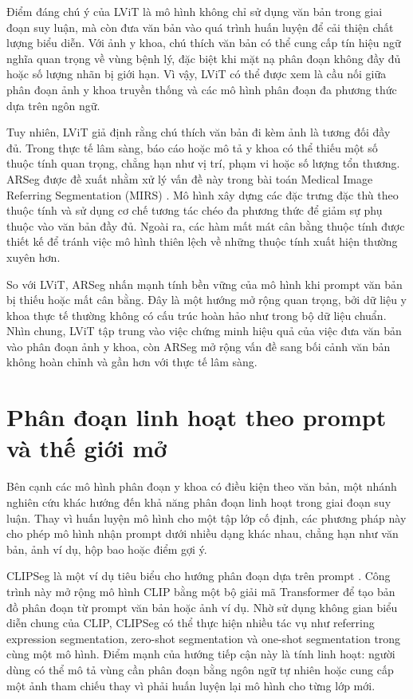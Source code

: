 Điểm đáng chú ý của LViT là mô hình không chỉ sử dụng văn bản trong giai đoạn suy luận, mà còn đưa văn bản vào quá trình huấn luyện để cải thiện chất lượng biểu diễn. Với ảnh y khoa, chú thích văn bản có thể cung cấp tín hiệu ngữ nghĩa quan trọng về vùng bệnh lý, đặc biệt khi mặt nạ phân đoạn không đầy đủ hoặc số lượng nhãn bị giới hạn. Vì vậy, LViT có thể được xem là cầu nối giữa phân đoạn ảnh y khoa truyền thống và các mô hình phân đoạn đa phương thức dựa trên ngôn ngữ.

Tuy nhiên, LViT giả định rằng chú thích văn bản đi kèm ảnh là tương đối đầy đủ. Trong thực tế lâm sàng, báo cáo hoặc mô tả y khoa có thể thiếu một số thuộc tính quan trọng, chẳng hạn như vị trí, phạm vi hoặc số lượng tổn thương. ARSeg được đề xuất nhằm xử lý vấn đề này trong bài toán Medical Image Referring Segmentation (MIRS) \cite{Wang_Lin_Yan}. Mô hình xây dựng các đặc trưng đặc thù theo thuộc tính và sử dụng cơ chế tương tác chéo đa phương thức để giảm sự phụ thuộc vào văn bản đầy đủ. Ngoài ra, các hàm mất mát cân bằng thuộc tính được thiết kế để tránh việc mô hình thiên lệch về những thuộc tính xuất hiện thường xuyên hơn.

So với LViT, ARSeg nhấn mạnh tính bền vững của mô hình khi prompt văn bản bị thiếu hoặc mất cân bằng. Đây là một hướng mở rộng quan trọng, bởi dữ liệu y khoa thực tế thường không có cấu trúc hoàn hảo như trong bộ dữ liệu chuẩn. Nhìn chung, LViT tập trung vào việc chứng minh hiệu quả của việc đưa văn bản vào phân đoạn ảnh y khoa, còn ARSeg mở rộng vấn đề sang bối cảnh văn bản không hoàn chỉnh và gần hơn với thực tế lâm sàng.

\section{Phân đoạn linh hoạt theo prompt và thế giới mở}

Bên cạnh các mô hình phân đoạn y khoa có điều kiện theo văn bản, một nhánh nghiên cứu khác hướng đến khả năng phân đoạn linh hoạt trong giai đoạn suy luận. Thay vì huấn luyện mô hình cho một tập lớp cố định, các phương pháp này cho phép mô hình nhận prompt dưới nhiều dạng khác nhau, chẳng hạn như văn bản, ảnh ví dụ, hộp bao hoặc điểm gợi ý.

CLIPSeg là một ví dụ tiêu biểu cho hướng phân đoạn dựa trên prompt \cite{luddecke_image_2021}. Công trình này mở rộng mô hình CLIP bằng một bộ giải mã Transformer để tạo bản đồ phân đoạn từ prompt văn bản hoặc ảnh ví dụ. Nhờ sử dụng không gian biểu diễn chung của CLIP, CLIPSeg có thể thực hiện nhiều tác vụ như referring expression segmentation, zero-shot segmentation và one-shot segmentation trong cùng một mô hình. Điểm mạnh của hướng tiếp cận này là tính linh hoạt: người dùng có thể mô tả vùng cần phân đoạn bằng ngôn ngữ tự nhiên hoặc cung cấp một ảnh tham chiếu thay vì phải huấn luyện lại mô hình cho từng lớp mới.

